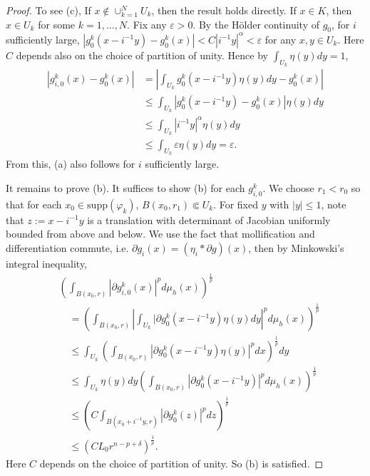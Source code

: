 \documentclass[12pt]{amsart}
\theoremstyle{remark}
\numberwithin{equation}{section}
\def\e{\varepsilon}
\begin{document}
\begin{proof}
To see (c), If $x\notin \cup_{k=1}^N U_k$, then the result holds directly.  If $x \in K$, then $x \in U_k$ for some $k = 1,\dots,N$. Fix any $\e>0$. By the H\"older continuity of $g_0$, for $i$ sufficiently large, $|g_0^k(x-i^{-1}y) - g_0^k(x)| < C|i^{-1}y|^\alpha <\varepsilon$ for any $x, y \in U_k$. Here $C$ depends also on the choice of partition of unity. Hence by $\int_{U_k} \eta(y)dy = 1$,
    \begin{align*}
        |g_{i,0}^k(x) - g_0^k(x)| &= \left|\int_{U_k} g_0^k(x-i^{-1}y)\eta(y)dy - g_0^k(x)\right| \nonumber \\
        &\leq \int_{U_k} | g_0^k(x-i^{-1}y) - g_0^k(x)|\eta(y)dy \nonumber \\
        &\leq \int_{U_k} |i^{-1}y|^\alpha \eta(y)dy \nonumber \\
        &\leq \int_{U_k} \varepsilon \eta(y)dy \nonumber = \varepsilon.
    \end{align*}
    From this, (a) also follows  for $i$ sufficiently large.
    
    
    
  It remains to prove (b). It suffices to show (b) for each $g_{i,0}^k$. We choose $r_1<r_0$ so that for each $x_0\in \mathrm{supp}(\varphi_k)$, $B(x_0,r_1)\Subset U_k$. For fixed $y$ with $|y| \leq 1$, note that $z:= x-i^{-1}y$ is a translation with determinant of Jacobian uniformly bounded from above and below. We use the fact that mollification and differentiation commute, i.e. $\partial g_i(x) = (\eta_i \ast \partial g)(x)$, then by Minkowski's integral inequality,
    \begin{align*}
        &\left(\int_{B(x_0,r)}|\partial g_{i,0}^k(x)|^pd\mu_h(x)\right)^\frac{1}{p} \nonumber \\
        &\quad= \left(\int_{B(x_0,r)}\left|\int_{U_k} |\partial g_0^k(x-i^{-1}y)\eta(y)dy\right|^{p}d\mu_h(x)\right)^\frac{1}{p} \nonumber \\
        &\quad\leq \int_{U_k} \left(\int_{B(x_0,r)}|\partial g_0^k(x-i^{-1}y)\eta(y)|^pdx\right)^\frac{1}{p}dy \nonumber \\
        &\quad\leq \int_{U_k}\eta(y)dy\left(\int_{B(x_0,r)} |\partial g_0^k(x-i^{-1}y)|^p d\mu_h(x)\right)^\frac{1}{p} \nonumber \\
        &\quad\leq \left(C\int_{B(x_0 + i^{-1}y, r)} |\partial g_0^k(z)|^p dz\right)^\frac{1}{p} \nonumber \\
        &\quad\leq \left(CL_0 r^{n-p+\delta}\right)^\frac{1}{p}.
    \end{align*}
 Here $C$ depends on the choice of partition of unity. So (b) is satisfied.
    

\end{proof}
\end{document}
